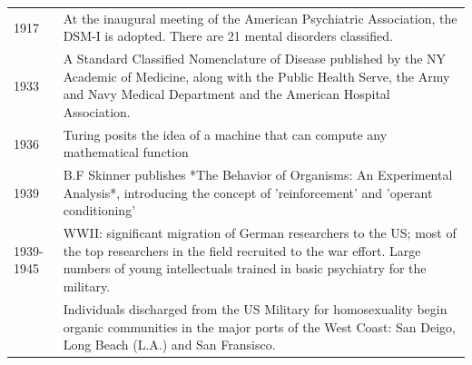 \begin{longtable}[!t]{ | P{2cm} | P{11.8cm} | }
1917&At the inaugural meeting of the American Psychiatric Association, the DSM-I is adopted. There are 21 mental disorders classified. \\
1933&A Standard Classified Nomenclature of Disease published by the NY Academic of Medicine, along with the Public Health Serve, the Army and Navy Medical Department and the American Hospital Association. \\
1936&Turing posits the idea of a machine that can compute any mathematical function \\
1939&B.F Skinner publishes *The Behavior of Organisms: An Experimental Analysis*, introducing the concept of 'reinforcement' and 'operant conditioning' \\

1939-1945& WWII: significant migration of German researchers to the US; most of the top researchers in the field recruited to the war effort. Large numbers of young intellectuals trained in basic psychiatry for the military. \\
 &Individuals discharged from the US Military for homosexuality begin organic communities in the major ports of the West Coast: San Deigo, Long Beach (L.A.) and San Fransisco. \\


\end{longtable}
